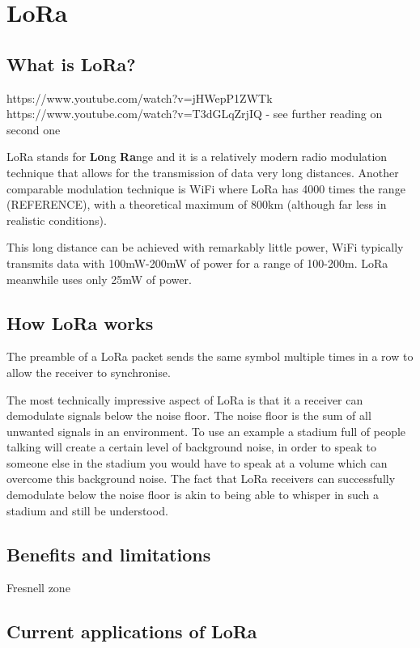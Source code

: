 \section{LoRa}

\subsection{What is LoRa?}

https://www.youtube.com/watch?v=jHWepP1ZWTk
https://www.youtube.com/watch?v=T3dGLqZrjIQ
- see further reading on second one

LoRa stands for \textbf{Lo}ng \textbf{Ra}nge and it is a relatively modern radio
modulation technique that allows for the transmission of data very long
distances. Another comparable modulation technique is WiFi where LoRa has 4000
times the range (REFERENCE), with a theoretical maximum of 800km (although far
less in realistic conditions).

This long distance can be achieved with remarkably little power, WiFi typically
transmits data with 100mW-200mW of power for a range of 100-200m. LoRa meanwhile
uses only 25mW of power.

\subsection{How LoRa works}

The preamble of a LoRa packet sends the same symbol multiple times in a row to
allow the receiver to synchronise.

The most technically impressive aspect of LoRa is that it a receiver can
demodulate signals below the noise floor. The noise floor is the sum of all
unwanted signals in an environment. To use an example a stadium full of people
talking will create a certain level of background noise, in order to speak to
someone else in the stadium you would have to speak at a volume which can
overcome this background noise. The fact that LoRa receivers can successfully
demodulate below the noise floor is akin to being able to whisper in such a
stadium and still be understood.

\subsection{Benefits and limitations}

Fresnell zone


\subsection{Current applications of LoRa}